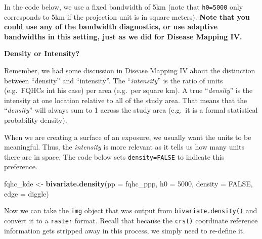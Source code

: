 \documentclass[
]{book}
\newenvironment{Shaded}{\begin{snugshade}}{\end{snugshade}}
\newcommand{\AttributeTok}[1]{\textcolor[rgb]{0.13,0.29,0.53}{#1}}
\newcommand{\ConstantTok}[1]{\textcolor[rgb]{0.56,0.35,0.01}{#1}}
\newcommand{\DecValTok}[1]{\textcolor[rgb]{0.00,0.00,0.81}{#1}}
\newcommand{\FunctionTok}[1]{\textcolor[rgb]{0.13,0.29,0.53}{\textbf{#1}}}
\newcommand{\NormalTok}[1]{#1}
\newcommand{\OtherTok}[1]{\textcolor[rgb]{0.56,0.35,0.01}{#1}}
\newcommand{\SpecialCharTok}[1]{\textcolor[rgb]{0.81,0.36,0.00}{\textbf{#1}}}
\newcommand{\StringTok}[1]{\textcolor[rgb]{0.31,0.60,0.02}{#1}}
\newenvironment{rmdnote}[1]
  {
  \begin{itemize}
  \renewcommand{\labelitemi}{
    \raisebox{-.7\height}[0pt][0pt]{
      {\setkeys{Gin}{width=3em,keepaspectratio}\texttt{[image: images/\#1]}}
    }
  }
  \setlength{\fboxsep}{1em}
  \begin{note}
  \item
  }
  {
  \end{note}
  \end{itemize}
  }
\begin{document}
In the code below, we use a fixed bandwidth of 5km (note that \texttt{h0=5000} only corresponds to 5km if the projection unit is in square meters). \textbf{Note that you could use any of the bandwidth diagnostics, or use adaptive bandwidths in this setting, just as we did for Disease Mapping IV.}

\begin{rmdnote}{note}
\textbf{Density or Intensity?}

Remember, we had some discussion in Disease Mapping IV about the distinction between ``density'' and ``intensity''. The ``\emph{intensity}'' is the ratio of units (e.g.~FQHCs int his case) per area (e.g.~per square km). A true ``\emph{density}'' is the intensity at one location relative to all of the study area. That means that the ``\emph{density}'' will always sum to 1 across the study area (e.g.~it is a formal statistical probability density).

When we are creating a surface of an exposure, we usually want the units to be meaningful. Thus, the \emph{intensity} is more relevant as it tells us how many units there are in space. The code below sets \texttt{density=FALSE} to indicate this preference.

\end{rmdnote}

\begin{Shaded}
\begin{Highlighting}[]
\NormalTok{fqhc\_kde }\OtherTok{\textless{}{-}} \FunctionTok{bivariate.density}\NormalTok{(}\AttributeTok{pp =}\NormalTok{ fqhc\_ppp, }
                              \AttributeTok{h0 =} \DecValTok{5000}\NormalTok{, }
                              \AttributeTok{density =} \ConstantTok{FALSE}\NormalTok{,}
                              \AttributeTok{edge =} \StringTok{\textquotesingle{}diggle\textquotesingle{}}\NormalTok{)}
\end{Highlighting}
\end{Shaded}

Now we can take the \texttt{img} object that was output from \texttt{bivariate.density()} and convert it to a \texttt{raster} format. Recall that because the \texttt{crs()} coordinate reference information gets stripped away in this process, we simply need to re-define it.

\begin{Shaded}
\end{Shaded}
\end{document}
